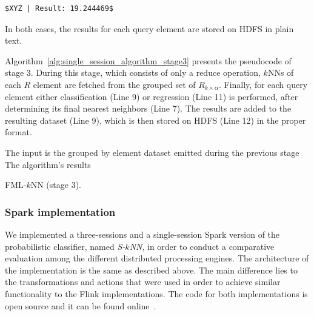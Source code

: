 \begin{lstlisting}[caption={The value estimation of element XYZ.}, label={lst:result2}, mathescape=true]
$XYZ | Result: 19.244469$
\end{lstlisting}

In both cases, the results for each query element are stored on HDFS in plain text.

Algorithm~\ref{alg:single_session_algorithm_stage3} presents the pseudocode of stage 3. During this stage, which consists of only a reduce operation, $k$NNs of each $R$ element are fetched from the grouped set of $R_{k \times \alpha}$. Finally, for each query element either classification (Line 9) or regression (Line 11) is performed, after determining its final nearest neighbors (Line 7). The results are added to the resulting dataset (Line 9), which is then stored on HDFS (Line 12) in the proper format.

\begin{algorithm}[!ht]
\begin{small}
	\DontPrintSemicolon
	\Comment The input is the grouped by element dataset emitted during the previous stage \;
	\Comment The algorithm's results \;
	\BlankLine
	\caption{FML-$k$NN (stage 3).}
	\label{alg:single_session_algorithm_stage3}
\end{small}
\end{algorithm}

\subsubsection{Spark implementation}
\label{par:spark}
We implemented a three-sessions and a single-session Spark version of the probabilistic classifier, named \textit{S-$k$NN}, in order to conduct a comparative evaluation among the different distributed processing engines. The architecture of the implementation is the same as described above. The main difference lies to the transformations and actions that were used in order to achieve similar functionality to the Flink implementations. The code for both implementations is open source and it can be found online~\cite{daiadAlgs}.


